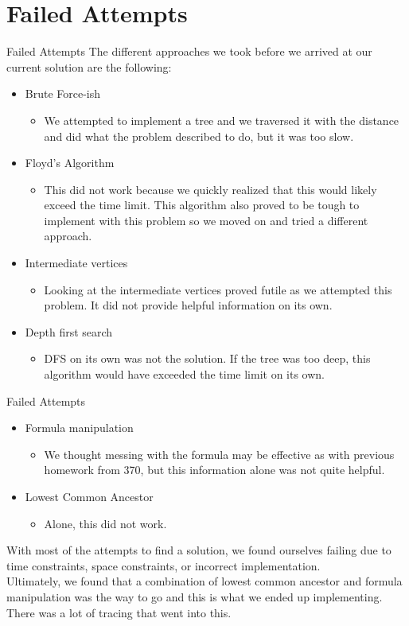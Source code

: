 \documentclass{beamer}
\begin{document}
\section{Failed Attempts}
\begin{frame}{Failed Attempts}
The different approaches we took before we arrived at our current solution are the following:
\begin{itemize}
    \item Brute Force-ish
    \begin{itemize}
        \item We attempted to implement a tree and we traversed it with the distance and did what the problem described to do, but it was too slow. 
    \end{itemize}
    \item Floyd's Algorithm
    \begin{itemize}
        \item This did not work because we quickly realized that this would likely exceed the time limit. This algorithm also proved to be tough to implement with this problem so we moved on and tried a different approach.
    \end{itemize}
    \item Intermediate vertices
    \begin{itemize}
        \item Looking at the intermediate vertices proved futile as we attempted this problem. It did not provide helpful information on its own. 
    \end{itemize}
    \item Depth first search
    \begin{itemize}
        \item DFS on its own was not the solution. If the tree was too deep, this algorithm would have exceeded the time limit on its own. 
    \end{itemize}
\end{itemize}
\end{frame}

\begin{frame}{Failed Attempts}
\begin{itemize}
    \item Formula manipulation
    \begin{itemize}
        \item We thought messing with the formula may be effective as with previous homework from 370, but this information alone was not quite helpful. 
    \end{itemize}
    \item Lowest Common Ancestor
    \begin{itemize}
        \item Alone, this did not work. 
    \end{itemize}
\end{itemize}
With most of the attempts to find a solution, we found ourselves failing due to time constraints, space constraints, or incorrect implementation.
\\Ultimately, we found that a combination of lowest common ancestor and formula manipulation was the way to go and this is what we ended up implementing. There was a lot of tracing that went into this. 
\end{frame}
\end{document}
